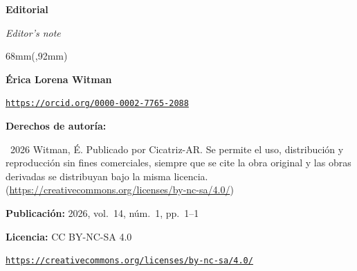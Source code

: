 
\renewcommand{\articuloidiomaxml}{es}
\renewcommand{\articulotitulo}{Editorial}
\renewcommand{\articuloautores}{Érica Lorena Witman}
\renewcommand{\articulotipo}{EDITORIAL}
\renewcommand{\articulorevista}{Cicatriz-AR}
\renewcommand{\articuloissne}{2618-3536}
\renewcommand{\articulovolumen}{14}
\renewcommand{\articulonumero}{1}
\renewcommand{\articulofecha}{ 2026}
\renewcommand{\articulopagina}{1}

\setcounter{page}{1}
\thispagestyle{firstpage}

\noindent\begin{minipage}[t]{\dimexpr\textwidth+\marginparsep+\marginparwidth\relax}%
{\sffamily\bfseries\Large\articulotitulo\par}%
\end{minipage}\par
\vspace{3mm}%
\renewcommand{\articulotitulotrans}{Editor's note}
\noindent\begin{minipage}[t]{\dimexpr\textwidth+\marginparsep+\marginparwidth\relax}%
{\sffamily\itshape\normalsize\articulotitulotrans\par}%
\end{minipage}\par
\vspace{4mm}%

\begin{textblock*}{68mm}(\gbbloquex,92mm)
{\setlength{\leftskip}{0pt}\setlength{\parindent}{0pt}%
\noindent\begin{minipage}[t]{68mm}
\sffamily\small\setlength{\parskip}{1pt}
{\bfseries\color{azulrevista}Érica Lorena Witman}\par
{\scriptsize\texttt{\href{https://orcid.org/0000-0002-7765-2088}{https://orcid.org/0000-0002-7765-2088}}}\par
\vspace{6pt}
{\bfseries\color{azulrevista!70}Derechos de autor\'ia:}\par
\textcopyright\ 2026 Witman, É. Publicado por Cicatriz-AR. Se permite el uso, distribución y reproducción sin fines comerciales, siempre que se cite la obra original y las obras derivadas se distribuyan bajo la misma licencia. (\href{https://creativecommons.org/licenses/by-nc-sa/4.0/}{https://creativecommons.org/licenses/by-nc-sa/4.0/})\par\vspace{6pt}
{\bfseries\color{azulrevista!70}Publicación:} 2026, vol.~14, n\'um.~1, pp.~1--1\par\vspace{6pt}
{\bfseries\color{azulrevista!70}Licencia:} CC BY-NC-SA 4.0\par
{\scriptsize\texttt{\href{https://creativecommons.org/licenses/by-nc-sa/4.0/}{https://creativecommons.org/licenses/by-nc-sa/4.0/}}}\par
\vspace{6pt}
\end{minipage}%
}%
\end{textblock*}


